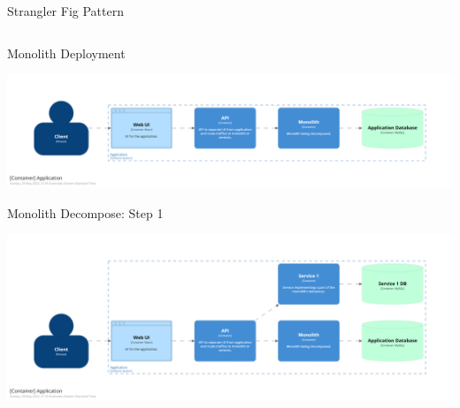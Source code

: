 \documentclass{slide}
\begin{document}
\begin{frame}{Strangler Fig Pattern}
\begin{columns}
    \end{columns}
\end{frame}

\begin{frame}{Monolith Deployment}
    \begin{adjustwidth}{-12mm}{-12mm}
        \centering
        \includegraphics[trim=195 195 195 195,clip,width=0.97\paperwidth]{diagrams/decompose1.png}
    \end{adjustwidth}
\end{frame}

\begin{frame}{Monolith Decompose: Step 1}
    \begin{adjustwidth}{-12mm}{-12mm}
        \centering
        \includegraphics[trim=195 195 195 195,clip,width=0.97\paperwidth]{diagrams/decompose2.png}
    \end{adjustwidth}
\end{frame}
\end{document}
